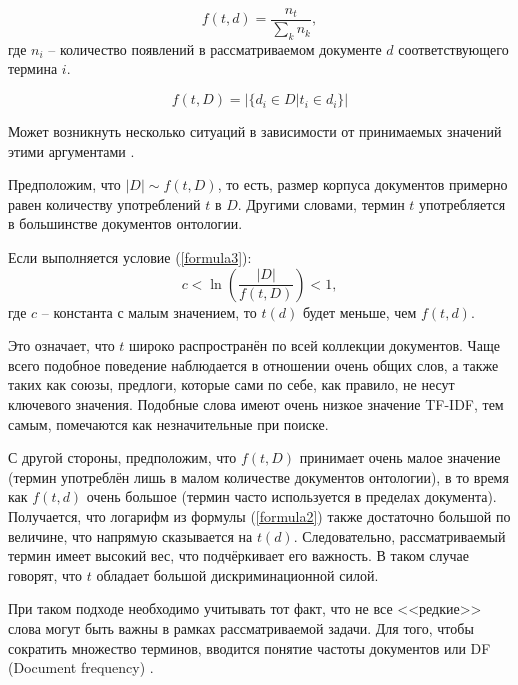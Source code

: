 \begin{equation}\label{formula7}
	f(t, d) = \frac{n_t}{\sum\limits_{k}n_k},
\end{equation}
где $n_i$ -- количество появлений в рассматриваемом документе $d$ соответствующего термина $i$.

\begin{equation}\label{formula8}
	f(t, D) = \left| \{d_i \in D | t_i \in d_i\} \right|
\end{equation}

Может возникнуть несколько ситуаций в зависимости от принимаемых значений этими аргументами \cite{using_tf_idf}.

Предположим, что $\left| D \right|  \sim f(t, D)$, то есть, размер корпуса документов примерно равен количеству употреблений $t$ в $D$. Другими словами, термин $t$ употребляется в большинстве документов онтологии.
	
Если выполняется условие (\ref{formula3}):
\begin{equation}\label{formula3}
	c < \ln \left( \frac{\left| D \right| }{f(t, D)} \right) < 1,
\end{equation}
где $c$ -- константа с малым значением, то $t(d)$ будет меньше, чем $f(t, d)$.

Это означает, что $t$ широко распространён по всей коллекции документов. Чаще всего подобное поведение наблюдается в отношении очень общих слов, а также таких как союзы, предлоги, которые сами по себе, как правило, не несут ключевого значения. Подобные слова имеют очень низкое значение TF-IDF, тем самым, помечаются как незначительные при поиске.

С другой стороны, предположим, что $f(t, D)$ принимает очень малое значение (термин употреблён лишь в малом количестве документов онтологии), в то время как $f(t, d)$ очень большое (термин часто используется в пределах документа). Получается, что логарифм из формулы (\ref{formula2}) также достаточно большой по величине, что напрямую сказывается на $t(d)$. Следовательно, рассматриваемый термин имеет высокий вес, что подчёркивает его важность. В таком случае говорят, что $t$ обладает большой дискриминационной силой.

При таком подходе необходимо учитывать тот факт, что не все <<редкие>> слова могут быть важны в рамках рассматриваемой задачи. Для того, чтобы сократить множество терминов, вводится понятие частоты документов или DF (Document frequency) \cite{evaluation_preprocessing}. \newline

